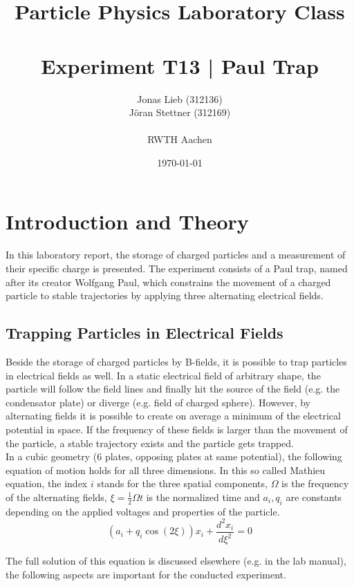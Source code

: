 \documentclass[
	paper=A4,
	parskip=full,
	chapterprefix=true,
	11pt,
	headings=normal,
	bibliography=totoc,
	listof=totoc,
	titlepage=on,
]{scrreprt}
\date{\today}
\title{Particle Physics Laboratory Class \\ \quad \\ Experiment T13 | Paul Trap }
\author{Jonas Lieb (312136) \\ Jöran Stettner (312169) \\ \\  RWTH Aachen}
\begin{document}
\maketitle

\cleardoublepage

\setcounter{tocdepth}{2}
\tableofcontents

\cleardoublepage

\chapter{Introduction and Theory}

In this laboratory report, the storage of charged particles and a measurement of their specific charge is presented. The experiment consists of a Paul trap, named after its creator Wolfgang Paul, which constrains the movement of a charged particle to stable trajectories by applying three alternating electrical fields. 

\section{Trapping Particles in Electrical Fields}

Beside the storage of charged particles by B-fields, it is possible to trap particles in electrical fields as well. In a static electrical field of arbitrary shape, the particle will follow the field lines and finally hit the source of the field (e.g. the condensator plate) or diverge (e.g. field of charged sphere). However, by alternating fields it is possible to create on average a minimum of the electrical potential in space. If the frequency of these fields is larger than the movement of the particle, a stable trajectory exists and the particle gets trapped. \\

In a cubic geometry (6 plates, opposing plates at same potential), the following equation of motion holds for all three dimensions. In this so called Mathieu equation, the index $i$ stands for the three spatial components, $\Omega$ is the frequency of the alternating fields, $\xi = \frac{1}{2} \Omega t$ is the normalized time and $a_i, q_i$ are constants depending on the applied voltages and properties of the particle.
\begin{equation}
\label{eq:mathieu}
\left(a_i+q_i \cos(2 \xi)\right) x_i + \frac{d^2x_i}{d\xi^2} = 0
\end{equation}

The full solution of this equation is discussed elsewhere (e.g. in the lab manual\cite{Lab_manual}), the following aspects are important for the conducted experiment.
\end{document}
